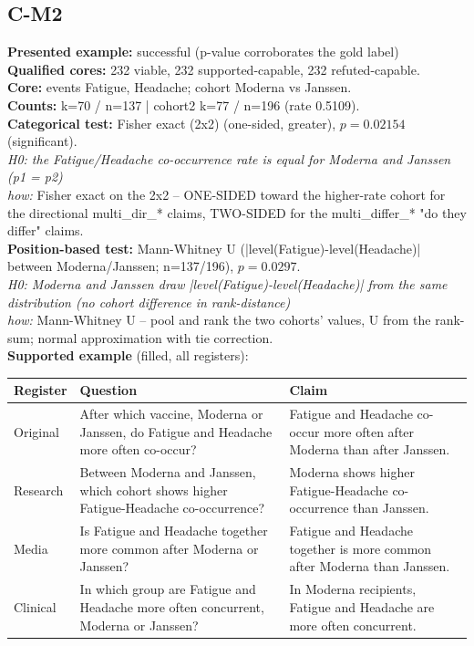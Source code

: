 \documentclass[11pt]{article}
\begin{document}
\subsection*{C-M2}
\textbf{Presented example:} successful (p-value corroborates the gold label) \\
\textbf{Qualified cores:} 232 viable, 232 supported-capable, 232 refuted-capable. \\
\textbf{Core:} events Fatigue, Headache; cohort Moderna vs Janssen. \\
\textbf{Counts:} k=70 / n=137  |  cohort2 k=77 / n=196  (rate 0.5109). \\
\textbf{Categorical test:} Fisher exact (2x2) (one-sided, greater), $p = 0.02154$ (significant). \\
\emph{H0: the Fatigue/Headache co-occurrence rate is equal for Moderna and Janssen (p1 = p2)} \\
\emph{how:} Fisher exact on the 2x2 -- ONE-SIDED toward the higher-rate cohort for the directional multi\_dir\_* claims, TWO-SIDED for the multi\_differ\_* "do they differ" claims. \\
\textbf{Position-based test:} Mann-Whitney U (|level(Fatigue)-level(Headache)| between Moderna/Janssen; n=137/196), $p = 0.0297$. \\
\emph{H0: Moderna and Janssen draw |level(Fatigue)-level(Headache)| from the same distribution (no cohort difference in rank-distance)} \\
\emph{how:} Mann-Whitney U -- pool and rank the two cohorts' values, U from the rank-sum; normal approximation with tie correction. \\
\textbf{Supported example} (filled, all registers): \\
\begin{tabularx}{\linewidth}{@{}l L L@{}}
\toprule
\textbf{Register} & \textbf{Question} & \textbf{Claim} \\
\midrule
Original & After which vaccine, Moderna or Janssen, do Fatigue and Headache more often co-occur? & Fatigue and Headache co-occur more often after Moderna than after Janssen. \\
Research & Between Moderna and Janssen, which cohort shows higher Fatigue-Headache co-occurrence? & Moderna shows higher Fatigue-Headache co-occurrence than Janssen. \\
Media & Is Fatigue and Headache together more common after Moderna or Janssen? & Fatigue and Headache together is more common after Moderna than Janssen. \\
Clinical & In which group are Fatigue and Headache more often concurrent, Moderna or Janssen? & In Moderna recipients, Fatigue and Headache are more often concurrent. \\
\bottomrule
\end{tabularx}
\end{document}
